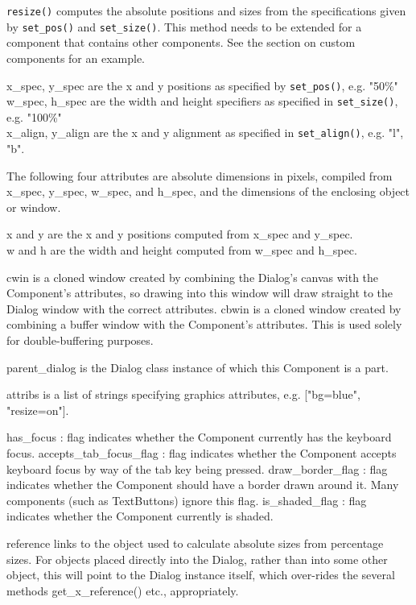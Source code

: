 \texttt{resize()} computes the absolute positions and sizes from the
specifications given by \texttt{set\_pos()} and
\texttt{set\_size()}. This method needs
to be extended for a component that contains other components. See the
section on custom components for an example.

x\_spec, y\_spec are the x and y positions as specified by \texttt{set\_pos()},
e.g. "50\%"\\
w\_spec, h\_spec are the width and height specifiers as specified in
\texttt{set\_size()}, e.g. "100\%"\\
x\_align, y\_align are the x and y alignment as specified in
\texttt{set\_align()}, e.g. "l",
"b".

The following four attributes are absolute dimensions in pixels,
compiled from x\_spec, y\_spec, w\_spec, and h\_spec, and the
dimensions of the enclosing object or window.

x and y are the x and y positions computed from x\_spec and
y\_spec.\\
w and h are the width and height computed from w\_spec and h\_spec.

cwin is a cloned window created by combining the
Dialog's canvas with the Component's
attributes, so drawing into this window will draw straight to the
Dialog window with the correct attributes. cbwin is a cloned window
created by combining a buffer window with the
Component's attributes. This is used solely for
double-buffering purposes.

parent\_dialog is the Dialog class instance of which
this Component is a part.

attribs is a list of strings specifying graphics attributes, e.g.
["bg=blue",
"resize=on"].

has\_focus : flag indicates whether the Component currently has the
keyboard focus. accepts\_tab\_focus\_flag : flag indicates whether the
Component accepts keyboard focus by way of the tab key being pressed.
draw\_border\_flag : flag indicates whether the Component should have a
border drawn around it. Many components (such as TextButtons) ignore
this flag. is\_shaded\_flag : flag indicates whether the Component
currently is shaded.

reference links to the object used to calculate absolute sizes from
percentage sizes. For objects placed directly into the Dialog, rather
than into some other object, this will point to the Dialog instance
itself, which over-rides the several methods get\_x\_reference() etc.,
appropriately.

